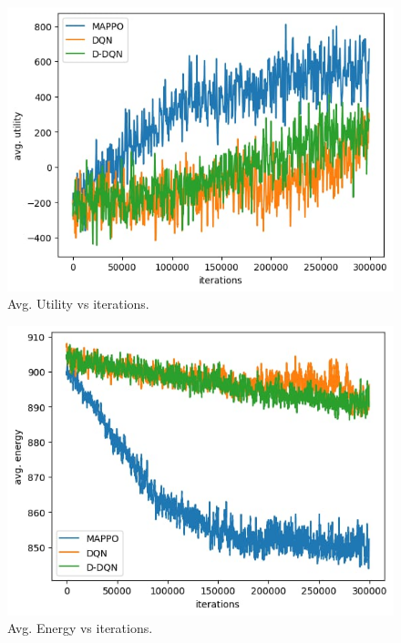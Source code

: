 \documentclass[conference]{IEEEtran}
\begin{document}
\begin{figure}[htbp]
\centerline{\includegraphics[trim=10 0 0 0, clip,width=1\columnwidth]{Utility_final.png}}
\caption{Avg. Utility vs iterations.}
\label{p2}
\end{figure}
\begin{figure}[htbp]
\centerline{\includegraphics[width=1\columnwidth]{Energy_final.png}}
\caption{Avg. Energy vs iterations.}
\label{p3}
\end{figure}
\end{document}

